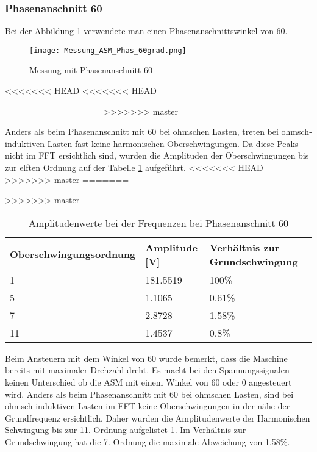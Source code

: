 \subsubsection*{Phasenanschnitt 60\textdegree}

Bei der Abbildung \ref{fig:Mess_ASM_Phas60} verwendete man einen Phasenanschnittswinkel von 60\textdegree.

\begin{figure}[ht!]
	\centering
	\texttt{[image: Messung\_ASM\_Phas\_60grad.png]}	
	\caption{Messung mit Phasenanschnitt 60\textdegree}\label{fig:Mess_ASM_Phas60}
\end{figure}
<<<<<<< HEAD
<<<<<<< HEAD
 

=======
=======
>>>>>>> master

Anders als beim Phasenanschnitt mit 60\textdegree\hspace{0.02cm} bei ohmschen Lasten, treten bei ohmsch-induktiven Lasten fast keine harmonischen Oberschwingungen. Da diese Peaks nicht im FFT ersichtlich sind, wurden die Amplituden der Oberschwingungen bis zur elften Ordnung auf der Tabelle \ref{tab:Mess_Spannung_ASM_Phas60} aufgeführt. 
<<<<<<< HEAD
\newpage
>>>>>>> master
=======

\newpage
>>>>>>> master
\begin{table}[ht!]
	\centering
	\begin{tabular}{|l|l|l|}
		\hline
		Oberschwingungsordnung & Amplitude {[}V{]} & Verhältnis zur Grundschwingung \\ \hline
		1                      & 181.5519          & 100\%                          \\ \hline
		5                      & 1.1065            & 0.61\%                         \\ \hline
		7                      & 2.8728            & 1.58\%                         \\ \hline
		11                     & 1.4537            & 0.8\%                          \\ \hline
	\end{tabular}
\caption{Amplitudenwerte bei der Frequenzen bei Phasenanschnitt 60\textdegree}\label{tab:Mess_Spannung_ASM_Phas60}
\end{table}

Beim Ansteuern mit dem Winkel von 60\textdegree \hspace{0.02cm} wurde bemerkt, dass die Maschine bereits mit maximaler Drehzahl dreht. Es macht bei den Spannungssignalen keinen Unterschied ob die ASM mit einem Winkel von 60\textdegree \hspace{0.02cm} oder 0\textdegree \hspace{0.02cm} angesteuert wird. Anders als beim Phasenanschnitt mit 60\textdegree\hspace{0.02cm} bei ohmschen Lasten, sind bei ohmsch-induktiven Lasten im FFT keine Oberschwingungen in der nähe der Grundfrequenz ersichtlich. Daher wurden die Amplitudenwerte der Harmonischen Schwingung bis zur 11. Ordnung aufgelistet \ref{tab:Mess_Spannung_ASM_Phas60}. Im Verhältnis zur Grundschwingung hat die 7. Ordnung die maximale Abweichung von 1.58\%.


